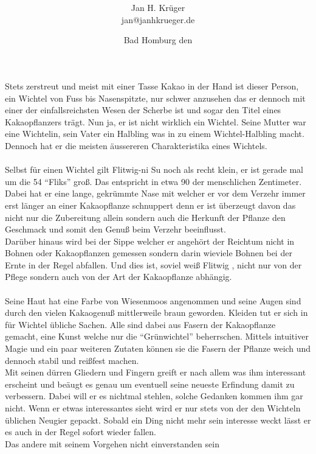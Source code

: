 \documentclass[10pt, a4paper]{proc}
\title{ \Huge{\Charname }}
\author{Jan H. Kr{\"u}ger\\jan@janhkrueger.de}
\date{Bad Homburg den \todayn}
\newcommand{\Charname}{Flitwig-ni Su }
\newcommand{\Kurzname}{Flitwig }
\begin{document}
\maketitle
Stets zerstreut und meist mit einer Tasse Kakao in der Hand ist
dieser Person, ein Wichtel von Fuss bis Nasenspitzte, nur schwer
anzusehen das er dennoch mit einer der einfallsreichsten Wesen der
Scherbe ist und sogar den Titel eines Kakaopflanzers tr{\"a}gt. Nun
ja, er ist nicht wirklich ein Wichtel. Seine Mutter war eine
Wichtelin, sein Vater ein Halbling was in zu einem
Wichtel-Halbling macht. Dennoch hat er die meisten {\"a}ussereren
Charakteristika eines Wichtels.
\\\\Selbst f{\"u}r einen Wichtel gilt \Charname noch als recht klein,
er ist gerade mal um die 54 "`Fliks"' gro{\ss}. Das entspricht in etwa
90 der menschlichen Zentimeter. Dabei hat er eine lange, gekr{\"u}mmte
Nase mit welcher er vor dem Verzehr immer erst l{\"a}nger an einer
Kakaopflanze schnuppert denn er ist {\"u}berzeugt davon das nicht nur
die Zubereitung allein sondern auch die Herkunft der Pflanze den
Geschmack und somit den Genu{\ss} beim Verzehr beeinflusst.\\Dar{\"u}ber
hinaus wird bei der Sippe welcher er angeh{\"o}rt der Reichtum nicht
in Bohnen oder Kakaopflanzen gemessen sondern darin wieviele
Bohnen bei der Ernte in der Regel abfallen. Und dies ist, soviel
wei{\ss} \Kurzname, nicht nur von der Pflege sondern auch von der Art
der Kakaopflanze abh{\"a}ngig.\\\\Seine Haut hat eine Farbe von
Wiesenmoos angenommen und seine Augen sind durch den vielen
Kakaogenu{\ss} mittlerweile braun geworden. Kleiden tut er sich in f{\"u}r
Wichtel {\"u}bliche Sachen. Alle sind dabei aus Fasern der
Kakaopflanze gemacht, eine Kunst welche nur die "`Gr{\"u}nwichtel"'
beherrschen. Mittels intuitiver Magie und ein paar weiteren
Zutaten k{\"o}nnen sie die Fasern der Pflanze weich und dennoch stabil
und rei{\ss}fest machen.\\Mit seinen d{\"u}rren Gliedern und Fingern
greift er nach allem was ihm interessant erscheint und be{\"a}ugt es
genau um eventuell seine neueste Erfindung damit zu verbessern.
Dabei will er es nichtmal stehlen, solche Gedanken kommen ihm gar
nicht. Wenn er etwas interessantes sieht wird er nur stets von der
den Wichteln {\"u}blichen Neugier gepackt. Sobald ein Ding nicht mehr
sein interesse weckt l{\"a}sst er es auch in der Regel sofort wieder
fallen.\\Das andere mit seinem Vorgehen nicht einverstanden sein
\end{document}
